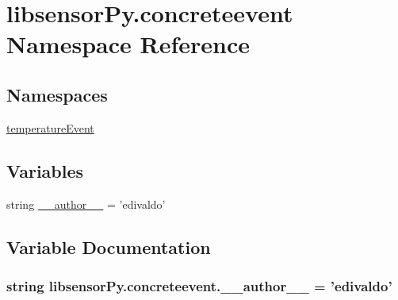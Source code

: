 \hypertarget{namespacelibsensorPy_1_1concreteevent}{}\section{libsensor\+Py.\+concreteevent Namespace Reference}
\label{namespacelibsensorPy_1_1concreteevent}
\subsection*{Namespaces}
\begin{DoxyCompactItemize}
\item 
 \hyperlink{namespacelibsensorPy_1_1concreteevent_1_1temperatureEvent}{temperature\+Event}
\end{DoxyCompactItemize}
\subsection*{Variables}
\begin{DoxyCompactItemize}
\item 
string \hyperlink{namespacelibsensorPy_1_1concreteevent_ae0b17a660e9cda962d56aa1f48f70d0a}{\+\_\+\+\_\+author\+\_\+\+\_\+} = 'edivaldo'
\end{DoxyCompactItemize}


\subsection{Variable Documentation}
\hypertarget{namespacelibsensorPy_1_1concreteevent_ae0b17a660e9cda962d56aa1f48f70d0a}{}
\subsubsection[{\+\_\+\+\_\+author\+\_\+\+\_\+}]{\setlength{\rightskip}{0pt plus 5cm}string libsensor\+Py.\+concreteevent.\+\_\+\+\_\+author\+\_\+\+\_\+ = 'edivaldo'}\label{namespacelibsensorPy_1_1concreteevent_ae0b17a660e9cda962d56aa1f48f70d0a}
